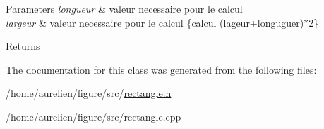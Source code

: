 \begin{DoxyParams}{Parameters}
{\em longueur} & valeur necessaire pour le calcul \\
\hline
{\em largeur} & valeur necessaire pour le calcul \{calcul (lageur+longuguer)$\ast$2\} \\
\hline
\end{DoxyParams}
\begin{DoxyReturn}{Returns}

\end{DoxyReturn}


The documentation for this class was generated from the following files\+:\begin{DoxyCompactItemize}
\item 
/home/aurelien/figure/src/\hyperlink{rectangle_8h}{rectangle.\+h}\item 
/home/aurelien/figure/src/rectangle.\+cpp\end{DoxyCompactItemize}

